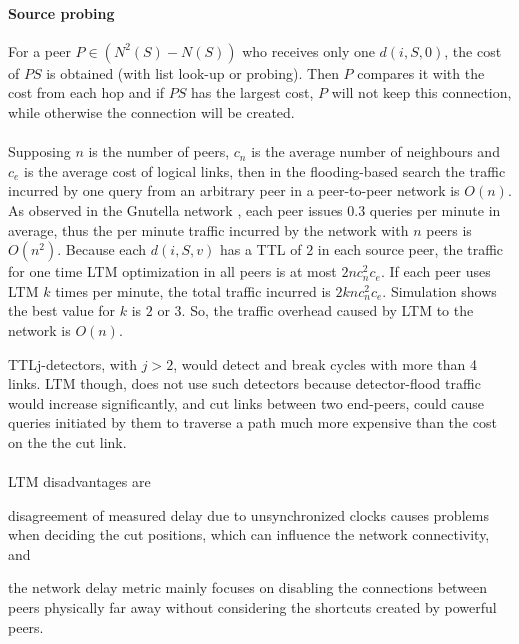 \documentclass[a4paper,10pt]{article}
\begin{document}
\paragraph*{Source probing}
For a peer $P\in(N^2(S) - N(S))$ who receives only one $d(i, S, 0)$, the cost of $PS$ is obtained (with list look-up or probing). Then $P$ compares it with the cost from each hop and if $PS$ has the largest cost, $P$ will not keep this connection, while otherwise the connection will be created.

\paragraph{}
Supposing $n$ is the number of peers, $c_n$ is the average number of neighbours and $c_e$ is the average cost of logical links, then in the flooding-based search the traffic incurred by one query from an arbitrary peer in a peer-to-peer network is $O(n)$. As observed in the Gnutella network \cite{sripanidkulchai_gnutella_2001}, each peer issues $0.3$ queries per minute in average, thus the per minute traffic incurred by the network with $n$ peers is $O(n^2)$. Because each $d(i, S, v)$ has a TTL of $2$ in each source peer, the traffic for one time LTM optimization in all peers is at most $2nc_n^2c_e$. If each peer uses LTM $k$ times per minute, the total traffic incurred is $2knc_n^2c_e$. Simulation shows the best value for $k$ is $2$ or $3$. So, the traffic overhead caused by LTM to the network is $O(n)$.

TTLj-detectors, with $j > 2$, would detect and break cycles with more than 4 links. LTM though, does not use such detectors because detector-flood traffic would increase significantly, and cut links between two end-peers, could cause queries initiated by them to traverse a path much more expensive than the cost on the the cut link.

\paragraph{}
LTM disadvantages are
\begin{inparaenum}
  \item disagreement of measured delay due to unsynchronized clocks causes problems when deciding the cut positions, which can influence the network connectivity, and
  \item the network delay metric mainly focuses on disabling the connections between peers physically far away without considering the shortcuts created by powerful peers.
\end{inparaenum}
\end{document}

